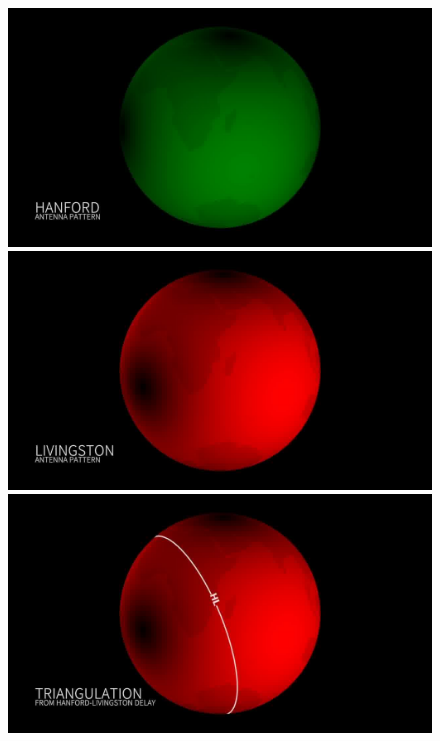\begin{figure}
  \begin{minipage}{0.45\linewidth}
    \centering
    \includegraphics[width=\linewidth]{sectionDetection/antenna-patterns_LeoSinger/00012.jpg}
  \end{minipage}
  \hfill
  \begin{minipage}{0.45\linewidth}
    \centering
    \includegraphics[width=\linewidth]{sectionDetection/antenna-patterns_LeoSinger/00118.jpg}
  \end{minipage}
  \hfill
  \begin{minipage}{0.45\linewidth}
    \centering
    \includegraphics[width=\linewidth]{sectionDetection/antenna-patterns_LeoSinger/00227.jpg}

\end{minipage}
\end{figure}
